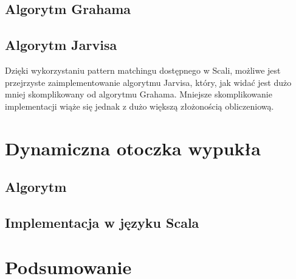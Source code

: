    		
   		\newpage
   		
   		\newpage
   		
   		\newpage
   		\section{Algorytm Grahama}
   		
   		\newpage
   		
   		\newpage
   		
   		
   		\section{Algorytm Jarvisa}
   		Dzięki wykorzystaniu pattern matchingu dostępnego w Scali, możliwe jest przejrzyste zaimplementowanie algorytmu Jarvisa, który, jak widać jest dużo mniej skomplikowany od algorytmu Grahama. Mniejsze skomplikowanie implementacji wiąże się jednak z dużo większą złożonością obliczeniową.
        
        
    \chapter{Dynamiczna otoczka wypukła}
    	\section{Algorytm}
    	\section{Implementacja w języku Scala} 
	\chapter{Podsumowanie} 
    \printbibliography[heading=bibintoc]

